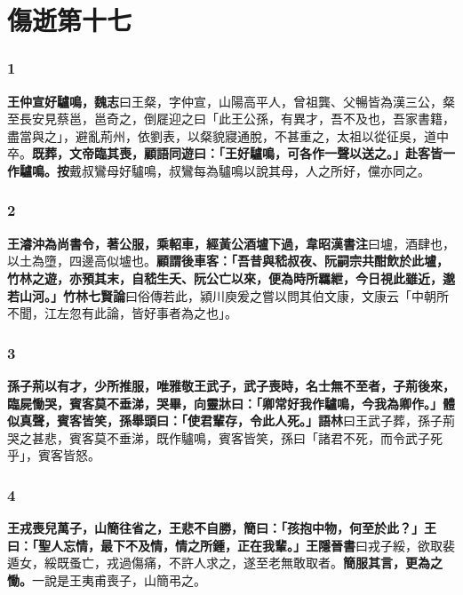 \chapter{傷逝第十七}

\subsection*{1}

\textbf{王仲宣好驢鳴，}{\footnotesize \textbf{魏志}曰王粲，字仲宣，山陽高平人，曾祖龔、父暢皆為漢三公，粲至長安見蔡邕，邕奇之，倒屣迎之曰「此王公孫，有異才，吾不及也，吾家書籍，盡當與之」，避亂荊州，依劉表，以粲貌寢通脫，不甚重之，太祖以從征吳，道中卒。}\textbf{既葬，文帝臨其喪，顧語同遊曰：「王好驢鳴，可各作一聲以送之。」赴客皆一作驢鳴。}{\footnotesize \textbf{按}戴叔鸞母好驢鳴，叔鸞每為驢鳴以說其母，人之所好，儻亦同之。}

\subsection*{2}

\textbf{王濬沖為尚書令，著公服，乘軺車，經黃公酒壚下過，}{\footnotesize \textbf{韋昭漢書注}曰壚，酒肆也，以土為墮，四邊高似壚也。}\textbf{顧謂後車客：「吾昔與嵇叔夜、阮嗣宗共酣飲於此壚，竹林之遊，亦預其末，自嵇生夭、阮公亡以來，便為時所羈紲，今日視此雖近，邈若山河。」}{\footnotesize \textbf{竹林七賢論}曰俗傳若此，潁川庾爰之嘗以問其伯文康，文康云「中朝所不聞，江左忽有此論，皆好事者為之也」。}

\subsection*{3}

\textbf{孫子荊以有才，少所推服，唯雅敬王武子，武子喪時，名士無不至者，子荊後來，臨屍慟哭，賓客莫不垂涕，哭畢，向靈牀曰：「卿常好我作驢鳴，今我為卿作。」體似真聲，賓客皆笑，孫舉頭曰：「使君輩存，令此人死。」}{\footnotesize \textbf{語林}曰王武子葬，孫子荊哭之甚悲，賓客莫不垂涕，既作驢鳴，賓客皆笑，孫曰「諸君不死，而令武子死乎」，賓客皆怒。}

\subsection*{4}

\textbf{王戎喪兒萬子，山簡往省之，王悲不自勝，簡曰：「孩抱中物，何至於此？」王曰：「聖人忘情，最下不及情，情之所鍾，正在我輩。」}{\footnotesize \textbf{王隱晉書}曰戎子綏，欲取裴遁女，綏既蚤亡，戎過傷痛，不許人求之，遂至老無敢取者。}\textbf{簡服其言，更為之慟。}{\footnotesize 一說是王夷甫喪子，山簡弔之。}

